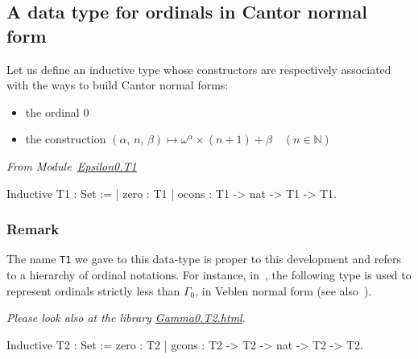 \documentclass[a4paper]{book}
\begin{document}
\subsection{A data type for  ordinals in Cantor normal form}
\label{sec:orgheadline72}
\label{sec:T1-inductive-def}





    Let us define an inductive type whose 
constructors are respectively associated
with the ways to build Cantor normal forms:

\begin{itemize}
\item the ordinal \(0\)
\item the construction \((\alpha,\, n,\,\beta)  \mapsto \omega^\alpha \times (n + 1)+ \beta \quad (n\in\mathbb{N})\)
\end{itemize}


\vspace{4pt}
\noindent\emph{From Module~\href{../src/html/hydras.Epsilon0.T1.html\#T1}{Epsilon0.T1}}

\label{types:T1}


\begin{Coqsrc}
Inductive T1 : Set  :=
| zero : T1
| ocons : T1 -> nat -> T1 -> T1.
\end{Coqsrc}



\subsubsection*{Remark}
\label{sec:orgheadline66}


The name \texttt{T1} we gave to this data-type  is proper to this development and refers
to a hierarchy of ordinal notations. For instance, in~\cite{CantorContrib}, the following type is used to represent ordinals strictly less than \(\Gamma_0\),  in Veblen normal form (see also~\cite{schutte}).

\label{types:T2}
\emph{Please look also at the library
\href{../src/html/hydras.Gamma0.T2.html}{Gamma0.T2.html}}.


\begin{Coqsrc}
Inductive T2 : Set :=
  zero : T2
| gcons : T2 -> T2 -> nat -> T2 -> T2.
\end{Coqsrc}
\end{document}
